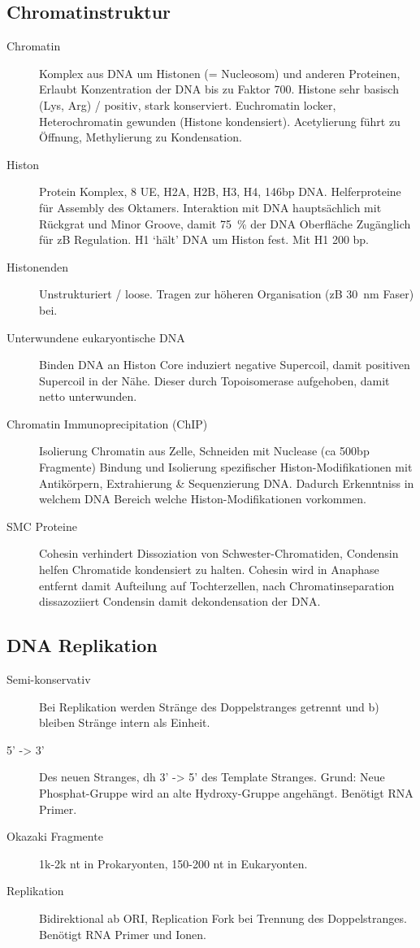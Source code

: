 \documentclass[a4paper,twocolumn,usegeometry,english,fontsize=6,DIV=16]{scrartcl}
\begin{document}
\subsection{Chromatinstruktur}
\begin{description}
	\item[Chromatin] Komplex aus DNA um Histonen (= Nucleosom) und anderen
		Proteinen, Erlaubt Konzentration der DNA bis zu Faktor 700.
		Histone sehr basisch (Lys, Arg) / positiv, stark konserviert.
		Euchromatin locker, Heterochromatin gewunden (Histone
		kondensiert).  Acetylierung führt zu Öffnung, Methylierung zu
		Kondensation.
	\item[Histon] Protein Komplex, 8 UE, H2A, H2B, H3, H4, 146bp DNA.
		Helferproteine für Assembly des Oktamers. Interaktion mit DNA
		hauptsächlich mit Rückgrat und Minor Groove, damit
		\SI{75}{\percent} der DNA Oberfläche Zugänglich für zB
		Regulation. H1 `hält' DNA um Histon fest. Mit H1 200 bp.
	\item[Histonenden] Unstrukturiert / loose. Tragen zur höheren
		Organisation (zB \SI{30}{\nm} Faser) bei.
	\item[Unterwundene eukaryontische DNA] Binden DNA an Histon Core
		induziert negative Supercoil, damit positiven Supercoil in der
		Nähe. Dieser durch Topoisomerase aufgehoben, damit netto
		unterwunden.
	\item[Chromatin Immunoprecipitation (ChIP)] Isolierung Chromatin aus
		Zelle, Schneiden mit Nuclease (ca 500bp Fragmente) Bindung und
		Isolierung spezifischer Histon-Modifikationen mit Antikörpern,
		Extrahierung \& Sequenzierung DNA. Dadurch Erkenntniss in
		welchem DNA Bereich welche Histon-Modifikationen vorkommen.
	\item[SMC Proteine] Cohesin verhindert Dissoziation von
		Schwester-Chromatiden, Condensin helfen Chromatide kondensiert
		zu halten. Cohesin  wird in Anaphase entfernt damit Aufteilung
		auf Tochterzellen, nach Chromatinseparation dissazoziiert
		Condensin damit dekondensation der DNA.
\end{description}

\subsection{DNA Replikation}
\begin{description}
	\item[Semi-konservativ] Bei Replikation werden Stränge des
		Doppelstranges getrennt und b) bleiben Stränge intern als
		Einheit.
	\item[5' -> 3'] Des neuen Stranges, dh 3' -> 5' des Template Stranges.
		Grund: Neue Phosphat-Gruppe wird an alte Hydroxy-Gruppe
		angehängt. Benötigt RNA Primer.
	\item[Okazaki Fragmente] 1k-2k nt in Prokaryonten, 150-200 nt in
		Eukaryonten.
	\item[Replikation] Bidirektional ab ORI, Replication Fork bei Trennung
		des Doppelstranges. Benötigt RNA Primer und  Ionen.
\end{description}
\end{document}
